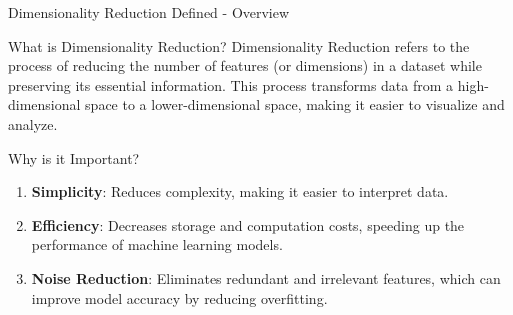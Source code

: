 \documentclass[aspectratio=169]{beamer}
\begin{document}
\begin{frame}[fragile]{Dimensionality Reduction Defined - Overview}
    \begin{block}{What is Dimensionality Reduction?}
        Dimensionality Reduction refers to the process of reducing the number of features (or dimensions) in a dataset while preserving its essential information. This process transforms data from a high-dimensional space to a lower-dimensional space, making it easier to visualize and analyze.
    \end{block}

    \begin{block}{Why is it Important?}
        \begin{enumerate}
            \item \textbf{Simplicity}: Reduces complexity, making it easier to interpret data.
            \item \textbf{Efficiency}: Decreases storage and computation costs, speeding up the performance of machine learning models.
            \item \textbf{Noise Reduction}: Eliminates redundant and irrelevant features, which can improve model accuracy by reducing overfitting.
        \end{enumerate}
    \end{block}
\end{frame}
\end{document}
